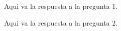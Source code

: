 \documentclass[letter]{article}
\begin{document}
	
	\begin{pregunta}{1} %
		Aqui va la respuesta a la pregunta 1.
		
	\end{pregunta}
	
	\begin{pregunta}{2}
		Aqui va la respuesta a la pregunta 2.
		
	\end{pregunta}
\end{document}
